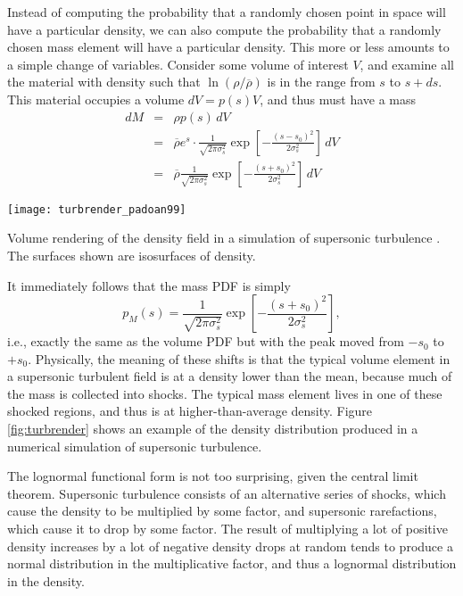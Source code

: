 Instead of computing the probability that a randomly chosen point in space will have a particular density, we can also compute the probability that a randomly chosen mass element will have a particular density. This more or less amounts to a simple change of variables. Consider some volume of interest $V$, and examine all the material with density such that $\ln(\rho/\overline{\rho})$ is in the range from $s$ to $s+ds$. This material occupies a volume $dV = p(s) V$, and thus must have a mass
\begin{eqnarray}
dM & = & \rho p(s) \, dV \\
& = & \overline{\rho} e^s \cdot \frac{1}{\sqrt{2\pi \sigma_s^2}} \exp\left[-\frac{(s-s_0)^2}{2\sigma_s^2}\right]\,  dV \\
& = & \overline{\rho} \frac{1}{\sqrt{2\pi \sigma_s^2}} \exp\left[-\frac{(s+s_0)^2}{2\sigma_s^2}\right]\,  dV
\end{eqnarray}
\begin{marginfigure}
\texttt{[image: turbrender\_padoan99]}
\caption[Volume Rendering of Density Field Supersonic Turbulence]{
\label{fig:turbrender}
Volume rendering of the density field in a simulation of supersonic turbulence \citep{padoan99a}. The surfaces shown are isosurfaces of density.
}
\end{marginfigure}
It immediately follows that the mass PDF is simply
\begin{equation}
p_M(s) = \frac{1}{\sqrt{2\pi \sigma_s^2}} \exp\left[-\frac{(s+s_0)^2}{2\sigma_s^2}\right],
\end{equation}
i.e., exactly the same as the volume PDF but with the peak moved from $-s_0$ to $+s_0$. Physically, the meaning of these shifts is that the typical volume element in a supersonic turbulent field is at a density lower than the mean, because much of the mass is collected into shocks. The typical mass element lives in one of these shocked regions, and thus is at higher-than-average density. Figure \ref{fig:turbrender} shows an example of the density distribution produced in a numerical simulation of supersonic turbulence.

The lognormal functional form is not too surprising, given the central limit theorem. Supersonic turbulence consists of an alternative series of shocks, which cause the density to be multiplied by some factor, and supersonic rarefactions, which cause it to drop by some factor. The result of multiplying a lot of positive density increases by a lot of negative density drops at random tends to produce a normal distribution in the multiplicative factor, and thus a lognormal distribution in the density.

